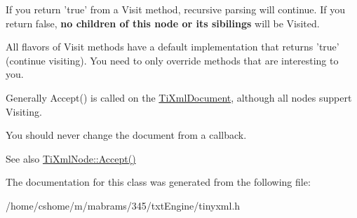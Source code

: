 If you return 'true' from a Visit method, recursive parsing will continue. If you return false, {\bfseries no children of this node or its sibilings} will be Visited.

All flavors of Visit methods have a default implementation that returns 'true' (continue visiting). You need to only override methods that are interesting to you.

Generally Accept() is called on the \hyperlink{class_ti_xml_document}{TiXmlDocument}, although all nodes suppert Visiting.

You should never change the document from a callback.

\begin{DoxySeeAlso}{See also}
\hyperlink{class_ti_xml_node_acc0f88b7462c6cb73809d410a4f5bb86}{TiXmlNode::Accept()} 
\end{DoxySeeAlso}


The documentation for this class was generated from the following file:\begin{DoxyCompactItemize}
\item 
/home/cshome/m/mabrams/345/txtEngine/tinyxml.h\end{DoxyCompactItemize}
